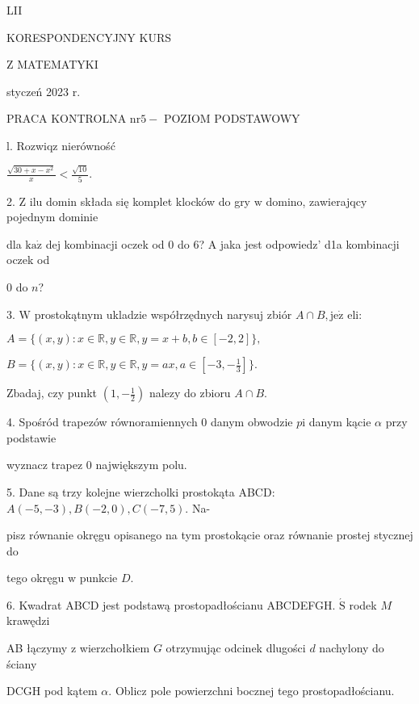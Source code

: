\documentclass[a4paper,12pt]{article}
\begin{document}
LII

KORESPONDENCYJNY KURS

Z MATEMATYKI

styczeń 2023 r.

PRACA KONTROLNA $\mathrm{n}\mathrm{r} 5-$ POZIOM PODSTAWOWY

l. Rozwiqz nierówność

$\displaystyle \frac{\sqrt{30+x-x^{2}}}{x}<\frac{\sqrt{10}}{5}.$

2. $\mathrm{Z}$ ilu domin składa się komplet klocków do gry $\mathrm{w}$ domino, zawierajqcy pojednym dominie

dla $\mathrm{k}\mathrm{a}\dot{\mathrm{z}}$ dej kombinacji oczek od 0 do 6? A jaka jest odpowiedz' d1a kombinacji oczek od

0 do $n$?

3. $\mathrm{W}$ prostokątnym ukladzie współrzędnych narysuj zbiór $A\cap B, \mathrm{j}\mathrm{e}\dot{\mathrm{z}}$ eli:

$A=\{(x,y):x\in \mathbb{R},y\in \mathbb{R},y=x+b,b\in[-2,2]\},$

$B=\displaystyle \{(x,y):x\in \mathbb{R},y\in \mathbb{R},y=ax,a\in[-3,-\frac{1}{3}]\}.$

Zbadaj, czy punkt $(1,-\displaystyle \frac{1}{2})$ nalezy do zbioru $A\cap B.$

4. Spośród trapezów równoramiennych $0$ danym obwodzie $p\mathrm{i}$ danym kącie $\alpha$ przy podstawie

wyznacz trapez $0$ największym polu.

5. Dane są trzy kolejne wierzcholki prostokąta ABCD: $A(-5,-3), B(-2,0), C(-7,5)$. Na-

pisz równanie okręgu opisanego na tym prostokącie oraz równanie prostej stycznej do

tego okręgu $\mathrm{w}$ punkcie $D.$

6. Kwadrat ABCD jest podstawą prostopadłościanu ABCDEFGH. $\acute{\mathrm{S}}$ rodek $M$ krawędzi

AB łączymy $\mathrm{z}$ wierzchołkiem $G$ otrzymując odcinek dlugości $d$ nachylony do ściany

DCGH pod kątem $\alpha$. Oblicz pole powierzchni bocznej tego prostopadłościanu.
\end{document}
